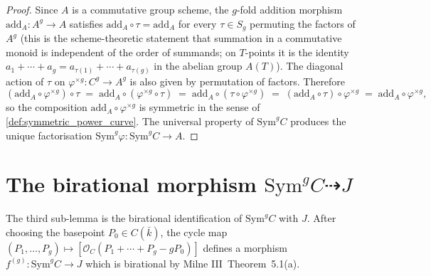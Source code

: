 \begin{proof}
  
  Since \(A\) is a commutative group scheme, the \(g\)-fold addition morphism
  \(\mathrm{add}_A \colon A^g \to A\) satisfies \(\mathrm{add}_A \circ \tau =
  \mathrm{add}_A\) for every \(\tau \in S_g\) permuting the factors of \(A^g\)
  (this is the scheme-theoretic statement that summation in a commutative
  monoid is independent of the order of summands; on \(T\)-points it is the
  identity \(a_1 + \cdots + a_g = a_{\tau(1)} + \cdots + a_{\tau(g)}\) in the
  abelian group \(A(T)\)). The diagonal action of \(\tau\) on \(\varphi^{\times
  g} \colon C^g \to A^g\) is also given by permutation of factors. Therefore
  \[
    (\mathrm{add}_A \circ \varphi^{\times g}) \circ \tau
    \;=\; \mathrm{add}_A \circ (\varphi^{\times g} \circ \tau)
    \;=\; \mathrm{add}_A \circ (\tau \circ \varphi^{\times g})
    \;=\; (\mathrm{add}_A \circ \tau) \circ \varphi^{\times g}
    \;=\; \mathrm{add}_A \circ \varphi^{\times g},
  \]
  so the composition \(\mathrm{add}_A \circ \varphi^{\times g}\) is symmetric
  in the sense of \cref{def:symmetric_power_curve}. The universal property
  of \(\mathrm{Sym}^g C\) produces the unique factorisation
  \(\mathrm{Sym}^g \varphi \colon \mathrm{Sym}^g C \to A\).
\end{proof}

\section{The birational morphism \(\mathrm{Sym}^g C \dashrightarrow J\)}
\label{sec:albaneseup_sym_g_to_jacobian}

The third sub-lemma is the birational identification of \(\mathrm{Sym}^g C\)
with \(J\). After choosing the basepoint \(P_0 \in C(\bar k)\), the cycle map
\((P_1, \ldots, P_g) \mapsto [\mathcal O_C(P_1 + \cdots + P_g - g P_0)]\)
defines a morphism \(f^{(g)} \colon \mathrm{Sym}^g C \to J\) which is
birational by Milne III~Theorem~5.1(a).

